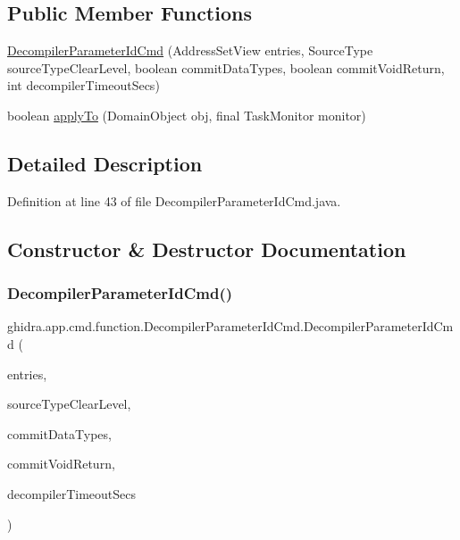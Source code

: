 \subsection*{Public Member Functions}
\begin{DoxyCompactItemize}
\item 
\mbox{\hyperlink{classghidra_1_1app_1_1cmd_1_1function_1_1_decompiler_parameter_id_cmd_ab98b502e8d42b39ebef9abb87f217be5}{Decompiler\+Parameter\+Id\+Cmd}} (Address\+Set\+View entries, Source\+Type source\+Type\+Clear\+Level, boolean commit\+Data\+Types, boolean commit\+Void\+Return, int decompiler\+Timeout\+Secs)
\item 
boolean \mbox{\hyperlink{classghidra_1_1app_1_1cmd_1_1function_1_1_decompiler_parameter_id_cmd_a320246a0ca39bb0566ba176453663889}{apply\+To}} (Domain\+Object obj, final Task\+Monitor monitor)
\end{DoxyCompactItemize}


\subsection{Detailed Description}


Definition at line 43 of file Decompiler\+Parameter\+Id\+Cmd.\+java.



\subsection{Constructor \& Destructor Documentation}
\mbox{\label{classghidra_1_1app_1_1cmd_1_1function_1_1_decompiler_parameter_id_cmd_ab98b502e8d42b39ebef9abb87f217be5}} 
\subsubsection{\texorpdfstring{DecompilerParameterIdCmd()}{DecompilerParameterIdCmd()}}
{\footnotesize\ttfamily ghidra.\+app.\+cmd.\+function.\+Decompiler\+Parameter\+Id\+Cmd.\+Decompiler\+Parameter\+Id\+Cmd (\begin{DoxyParamCaption}\item[{Address\+Set\+View}]{entries,  }\item[{Source\+Type}]{source\+Type\+Clear\+Level,  }\item[{boolean}]{commit\+Data\+Types,  }\item[{boolean}]{commit\+Void\+Return,  }\item[{int}]{decompiler\+Timeout\+Secs }\end{DoxyParamCaption})\hspace{0.3cm}{\ttfamily [inline]}}



